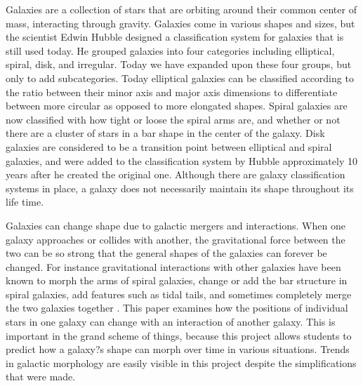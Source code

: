 \documentclass[11pt]{article}
\begin{document}
Galaxies are a collection of stars that are orbiting around their common center of mass, interacting through gravity.  Galaxies come in various shapes and sizes, but the scientist Edwin Hubble designed a classification system for galaxies that is still used today.  He grouped galaxies into four categories including elliptical, spiral, disk, and irregular.  Today we have expanded upon these four groups, but only to add subcategories.  Today elliptical galaxies can be classified according to the ratio between their minor axis and major axis dimensions to differentiate between more circular as opposed to more elongated shapes.  Spiral galaxies are now classified with how tight or loose the spiral arms are, and whether or not there are a cluster of stars in a bar shape in the center of the galaxy.  Disk galaxies are considered to be a transition point between elliptical and spiral galaxies, and were added to the classification system by Hubble approximately 10 years after he created the original one.   Although there are galaxy classification systems in place, a galaxy does not necessarily maintain its shape throughout its life time.

Galaxies can change shape due to galactic mergers and interactions.  When one galaxy approaches or collides with another, the gravitational force between the two can be so strong that the general shapes of the galaxies can forever be changed.  For instance gravitational interactions with other galaxies have been known to morph the arms of spiral galaxies, change or add the bar structure in spiral galaxies, add features such as tidal tails, and sometimes completely merge the two galaxies together \cite{Buta2006}.  This paper examines how the positions of individual stars in one galaxy can change with an interaction of another galaxy.  This is important in the grand scheme of things, because this project allows students to predict how a galaxy?s shape can morph over time in various situations.  Trends in galactic morphology are easily visible in this project despite the simplifications that were made.
\end{document}
